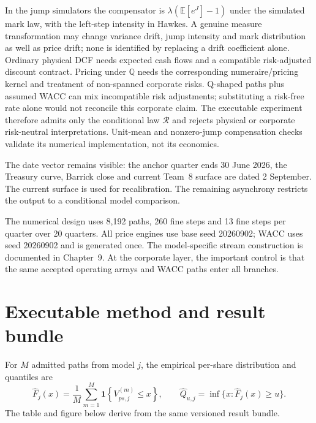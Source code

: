 In the jump simulators the compensator is
$\lambda(\mathbb E[e^J]-1)$ under the simulated mark law, with the left-step
intensity in Hawkes. A genuine measure transformation may change variance
drift, jump intensity and mark distribution as well as price drift; none is
identified by replacing a drift coefficient alone. Ordinary physical DCF
needs expected cash flows and a compatible risk-adjusted discount contract.
Pricing under $\mathbb Q$ needs the corresponding numeraire/pricing kernel
and treatment of non-spanned corporate risks. Q-shaped paths plus assumed
WACC can mix incompatible risk adjustments; substituting a risk-free rate
alone would not reconcile this corporate claim. The executable experiment
therefore admits only the conditional law $\mathcal R$ and rejects physical
or corporate risk-neutral interpretations. Unit-mean and nonzero-jump
compensation checks validate its numerical implementation, not its economics.

The date vector remains visible: the anchor quarter ends 30 June 2026, the
Treasury curve, Barrick close and current Team~8 surface are dated 2 September. The current surface is used for recalibration. The
remaining asynchrony restricts
the output to a conditional model comparison.

The numerical design uses 8,192 paths, 260 fine steps and 13 fine steps per
quarter over 20 quarters. All price engines use base seed 20260902; WACC uses
seed 20260902 and is generated once. The model-specific stream construction is
documented in Chapter~9. At the corporate layer, the important control is that
the same accepted operating arrays and WACC paths enter all branches.

\section{Executable method and result bundle}


For \(M\) admitted paths from model \(j\), the empirical per-share
distribution and quantiles are
\begin{equation}
\widehat F_j(x)=\frac{1}{M}\sum_{m=1}^{M}
\mathbf 1\!\left\{V_{ps,j}^{(m)}\leq x\right\},
\qquad
\widehat Q_{u,j}=\inf\{x:\widehat F_j(x)\geq u\}.
\end{equation}
The table and figure below derive from the same versioned result bundle.

